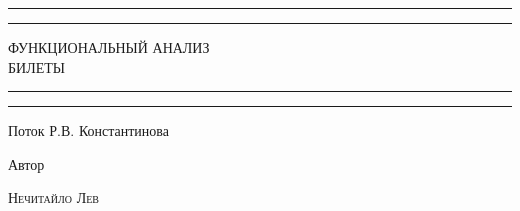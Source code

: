 \begin{titlepage} %
	
	\centering %
	
	\scshape %
	
	\vspace*{\baselineskip} %
	
	
	\rule{\textwidth}{1.6pt}\vspace*{-\baselineskip}\vspace*{2pt} %
	\rule{\textwidth}{0.4pt} %
	
	\vspace{0.75\baselineskip} %
	
	{\LARGE ФУНКЦИОНАЛЬНЫЙ АНАЛИЗ\\ БИЛЕТЫ\\} %
	
	\vspace{0.75\baselineskip} %
	
	\rule{\textwidth}{0.4pt}\vspace*{-\baselineskip}\vspace{3.2pt} %
	\rule{\textwidth}{1.6pt} %
	
	\vspace{2\baselineskip} %
	
	
	Поток Р.В. Константинова %
	
	\vspace*{3\baselineskip} %
	
	
	Автор
	
	\vspace{0.5\baselineskip} %
	
	{\scshape\large Нечитайло Лев \\} %
	

\end{titlepage}
